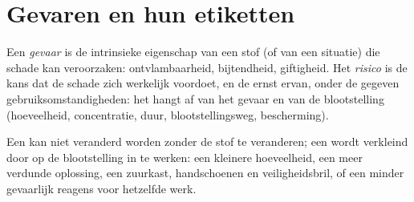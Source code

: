 \section{Gevaren en hun etiketten}

\begin{definition}\label{def:b1:lab-techniques-1:hazard}
Een \emph{gevaar} is de intrinsieke eigenschap van een stof
(of van een situatie) die schade kan veroorzaken: ontvlambaarheid,
bijtendheid, giftigheid. Het \emph{risico} is de kans dat de
schade zich werkelijk voordoet, en de ernst ervan, onder de gegeven
gebruiksomstandigheden: het hangt af van het gevaar en van de blootstelling
(hoeveelheid, concentratie, duur, blootstellingsweg, bescherming).
\end{definition}

Een  kan niet veranderd worden zonder de stof te veranderen; een
 wordt verkleind door op de blootstelling in te werken: een
kleinere hoeveelheid, een meer verdunde oplossing, een zuurkast,
handschoenen en veiligheidsbril, of een minder gevaarlijk reagens voor
hetzelfde werk.

